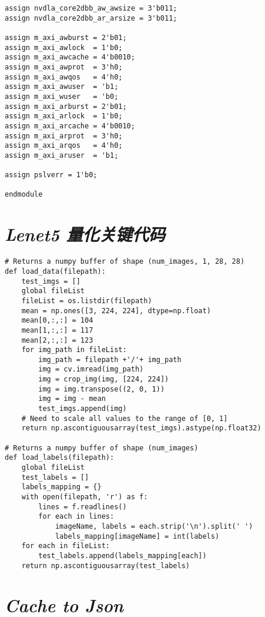 \begin{lstlisting}
assign nvdla_core2dbb_aw_awsize = 3'b011;
assign nvdla_core2dbb_ar_arsize = 3'b011;

assign m_axi_awburst = 2'b01;
assign m_axi_awlock  = 1'b0;
assign m_axi_awcache = 4'b0010;
assign m_axi_awprot  = 3'h0;
assign m_axi_awqos   = 4'h0;
assign m_axi_awuser  = 'b1;
assign m_axi_wuser   = 'b0;
assign m_axi_arburst = 2'b01;
assign m_axi_arlock  = 1'b0;
assign m_axi_arcache = 4'b0010;
assign m_axi_arprot  = 3'h0;
assign m_axi_arqos   = 4'h0;
assign m_axi_aruser  = 'b1;

assign pslverr = 1'b0;

endmodule
\end{lstlisting}

\section{\emph{Lenet5 量化关键代码}}

\lstset{language=Python}
\begin{lstlisting}
# Returns a numpy buffer of shape (num_images, 1, 28, 28)
def load_data(filepath):
    test_imgs = []
    global fileList
    fileList = os.listdir(filepath)
    mean = np.ones([3, 224, 224], dtype=np.float)
    mean[0,:,:] = 104
    mean[1,:,:] = 117
    mean[2,:,:] = 123
    for img_path in fileList:
        img_path = filepath +'/'+ img_path
        img = cv.imread(img_path)
        img = crop_img(img, [224, 224])
        img = img.transpose((2, 0, 1))
        img = img - mean
        test_imgs.append(img)
    # Need to scale all values to the range of [0, 1]
    return np.ascontiguousarray(test_imgs).astype(np.float32)

# Returns a numpy buffer of shape (num_images)
def load_labels(filepath):
    global fileList
    test_labels = []
    labels_mapping = {}
    with open(filepath, 'r') as f:
        lines = f.readlines()
        for each in lines:
            imageName, labels = each.strip('\n').split(' ')
            labels_mapping[imageName] = int(labels)
    for each in fileList:
        test_labels.append(labels_mapping[each])
    return np.ascontiguousarray(test_labels)
\end{lstlisting}

\section{\emph{Cache to Json}}

